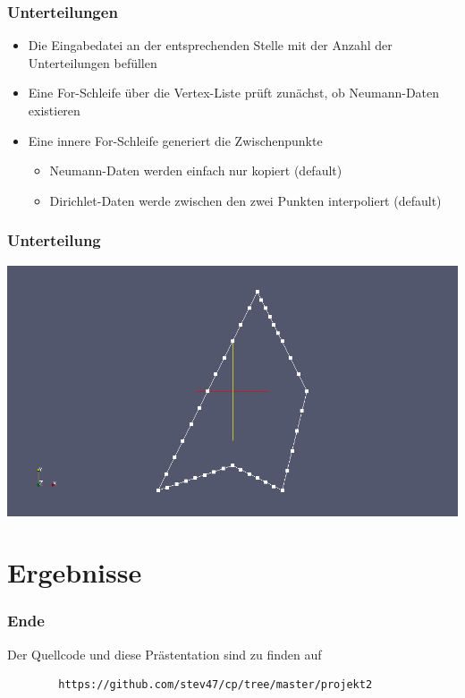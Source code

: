 \documentclass{beamer}
\begin{document}
\begin{frame}
	\frametitle{Unterteilungen}
	\begin{itemize}
		\item Die Eingabedatei an der entsprechenden Stelle mit der Anzahl der Unterteilungen bef\"ullen
		\item Eine For-Schleife \"uber die Vertex-Liste pr\"uft zun\"achst, ob Neumann-Daten existieren
		\item Eine innere For-Schleife generiert die Zwischenpunkte
		\begin{itemize}
			\item Neumann-Daten werden einfach nur kopiert (default)
			\item Dirichlet-Daten werde zwischen den zwei Punkten interpoliert (default)
		\end{itemize}
	\end{itemize}
\end{frame}

\begin{frame}
	\frametitle{Unterteilung}
	\includegraphics[scale=0.3]{snapshot1.png}
\end{frame}




\section{Ergebnisse}


\begin{frame}[fragile]
	\frametitle{Ende}
	Der Quellcode und diese Pr\"astentation sind zu finden auf
	\begin{verbatim}
		https://github.com/stev47/cp/tree/master/projekt2
	\end{verbatim}
\end{frame}
\end{document}

